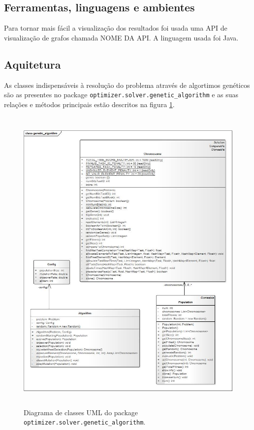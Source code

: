 \begin{titlepage}
\subsection{Ferramentas, linguagens e ambientes}
\justify\normalsize
Para tornar mais fácil a visualização dos resultados foi usada uma API de visualização de grafos chamada NOME DA API. A linguagem usada foi Java.

\subsection{Aquitetura}
\justify\normalsize
As classes indispensáveis à resolução do problema através de algortimos genéticos são as presentes no package \texttt{optimizer.solver.genetic\_algorithm} e as suas relações e métodos principais estão descritos na figura \ref{uml}.

\begin{figure}[H]
  \centering
    \includegraphics[width=13.5cm, height = 15.5cm]{uml.jpg}
  \caption{Diagrama de classes UML do package \texttt{optimizer.solver.genetic\_algorithm}.}
  \label{uml}
\end{figure}


\end{titlepage}
